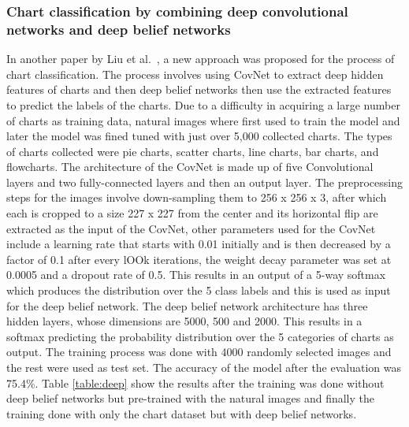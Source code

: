 \documentclass[12pt, a4paper,oneside]{report}
\begin{document}
\subsubsection{Chart classification by combining deep convolutional networks and deep belief networks}
In another paper by Liu et al.~\cite{liu2015chart}, a new approach was proposed for the process of chart classification. The process involves using CovNet to extract deep hidden features of charts and then deep belief networks then use the extracted features to predict the labels of the charts. Due to a difficulty in acquiring a large number of charts as training data, natural images where first used to train the model and later the model was fined tuned with just over 5,000 collected charts. The types of charts collected were pie charts, scatter charts, line charts, bar charts, and flowcharts. The architecture of the CovNet is made up of five Convolutional layers and two fully-connected layers and then an output layer. The preprocessing steps for the images involve down-sampling them to 256 x 256 x 3, after which each is cropped to a size 227 x 227 from the center and its horizontal flip are extracted as the input of the CovNet, other parameters used for the CovNet include a learning rate that starts with 0.01 initially and is then decreased by a factor of 0.1 after every lOOk iterations, the weight decay parameter was set at 0.0005 and a dropout rate of 0.5. This results in an output of a 5-way softmax which produces the distribution over the 5 class labels and this is used as input for the deep belief network. The deep belief network architecture has three hidden layers, whose dimensions are 5000, 500 and 2000. This results in a softmax predicting the probability
distribution over the 5 categories of charts as output.
The training process was done with 4000 randomly selected images and the rest were used as test set. The accuracy of the model after the evaluation was  75.4\%. Table \ref{table:deep} show the results after the training was done without deep belief networks but pre-trained with the natural images and finally the training done with only the chart dataset but with deep belief networks.
\end{document}
